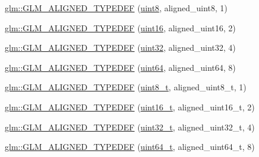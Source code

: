 \begin{DoxyCompactItemize}
\item 
\mbox{\hyperlink{group__gtx__type__aligned_gabde1d0b4072df35453db76075ab896a6}{glm\+::\+G\+L\+M\+\_\+\+A\+L\+I\+G\+N\+E\+D\+\_\+\+T\+Y\+P\+E\+D\+EF}} (\mbox{\hyperlink{group__gtc__type__precision_ga1a7dcd8aac97cc8020817c94049deff2}{uint8}}, aligned\+\_\+uint8, 1)
\item 
\mbox{\hyperlink{group__gtx__type__aligned_ga06c296c9e398b294c8c9dd2a7693dcbb}{glm\+::\+G\+L\+M\+\_\+\+A\+L\+I\+G\+N\+E\+D\+\_\+\+T\+Y\+P\+E\+D\+EF}} (\mbox{\hyperlink{group__gtc__type__precision_gad8c2939e1fdd8e5828b31d95c52255d5}{uint16}}, aligned\+\_\+uint16, 2)
\item 
\mbox{\hyperlink{group__gtx__type__aligned_gacf1744488c96ebd33c9f36ad33b2010a}{glm\+::\+G\+L\+M\+\_\+\+A\+L\+I\+G\+N\+E\+D\+\_\+\+T\+Y\+P\+E\+D\+EF}} (\mbox{\hyperlink{group__gtc__type__precision_ga202b6a53c105fcb7e531f9b443518451}{uint32}}, aligned\+\_\+uint32, 4)
\item 
\mbox{\hyperlink{group__gtx__type__aligned_ga3328061a64c20ba59d5f9da24c2cd059}{glm\+::\+G\+L\+M\+\_\+\+A\+L\+I\+G\+N\+E\+D\+\_\+\+T\+Y\+P\+E\+D\+EF}} (\mbox{\hyperlink{group__gtc__type__precision_gae3632bf9b37da66233d78930dd06378a}{uint64}}, aligned\+\_\+uint64, 8)
\item 
\mbox{\hyperlink{group__gtx__type__aligned_gaf6ced36f13bae57f377bafa6f5fcc299}{glm\+::\+G\+L\+M\+\_\+\+A\+L\+I\+G\+N\+E\+D\+\_\+\+T\+Y\+P\+E\+D\+EF}} (\mbox{\hyperlink{group__gtc__type__precision_ga93adf6dd9803408f3e3aaf9dedda352b}{uint8\+\_\+t}}, aligned\+\_\+uint8\+\_\+t, 1)
\item 
\mbox{\hyperlink{group__gtx__type__aligned_gafbc7fb7847bfc78a339d1d371c915c73}{glm\+::\+G\+L\+M\+\_\+\+A\+L\+I\+G\+N\+E\+D\+\_\+\+T\+Y\+P\+E\+D\+EF}} (\mbox{\hyperlink{group__gtc__type__precision_gac4eb4f43cae8129b00086dc234d3b8fc}{uint16\+\_\+t}}, aligned\+\_\+uint16\+\_\+t, 2)
\item 
\mbox{\hyperlink{group__gtx__type__aligned_gaa86bc56a73fd8120b1121b5f5e6245ae}{glm\+::\+G\+L\+M\+\_\+\+A\+L\+I\+G\+N\+E\+D\+\_\+\+T\+Y\+P\+E\+D\+EF}} (\mbox{\hyperlink{group__gtc__type__precision_ga822ca53a9ad412504532838906276a99}{uint32\+\_\+t}}, aligned\+\_\+uint32\+\_\+t, 4)
\item 
\mbox{\hyperlink{group__gtx__type__aligned_ga68c0b9e669060d0eb5ab8c3ddeb483d8}{glm\+::\+G\+L\+M\+\_\+\+A\+L\+I\+G\+N\+E\+D\+\_\+\+T\+Y\+P\+E\+D\+EF}} (\mbox{\hyperlink{group__gtc__type__precision_ga058f57c19e1befdcf12498944bd73e69}{uint64\+\_\+t}}, aligned\+\_\+uint64\+\_\+t, 8)
\item 

\end{DoxyCompactItemize}
